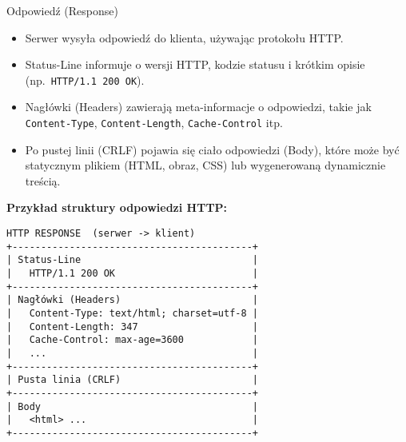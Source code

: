 \documentclass[10pt,compress,usenames,dvipsnames,aspectratio=169]{beamer}
\begin{document}
\begin{frame}[fragile]{Odpowiedź (Response)}
  \begin{itemize}
    \item Serwer wysyła odpowiedź do klienta, używając protokołu HTTP.
    \item Status-Line informuje o wersji HTTP, kodzie statusu i krótkim opisie (np.\ \texttt{HTTP/1.1 200 OK}).
    \item Nagłówki (Headers) zawierają meta-informacje o odpowiedzi, takie jak \texttt{Content-Type}, \texttt{Content-Length}, \texttt{Cache-Control} itp.
    \item Po pustej linii (CRLF) pojawia się ciało odpowiedzi (Body), które może być statycznym plikiem (HTML, obraz, CSS) lub wygenerowaną dynamicznie treścią.
  \end{itemize}

  \vspace{1ex}
  \textbf{Przykład struktury odpowiedzi HTTP:}
  \begin{center}
    \begin{minipage}{0.6\textwidth}
      \begin{lstlisting}[style=dark, basicstyle=\ttfamily\scriptsize\color{fgcode}, numbers=none, xleftmargin=1em, xrightmargin=1em]
HTTP RESPONSE  (serwer -> klient)
+------------------------------------------+
| Status-Line                              |
|   HTTP/1.1 200 OK                        |
+------------------------------------------+
| Nagłówki (Headers)                       |
|   Content-Type: text/html; charset=utf-8 |
|   Content-Length: 347                    |
|   Cache-Control: max-age=3600            |
|   ...                                    |
+------------------------------------------+
| Pusta linia (CRLF)                       |
+------------------------------------------+
| Body                                     |
|   <html> ...                             |
+------------------------------------------+
      \end{lstlisting}
    \end{minipage}
  \end{center}

\end{frame}
\end{document}
